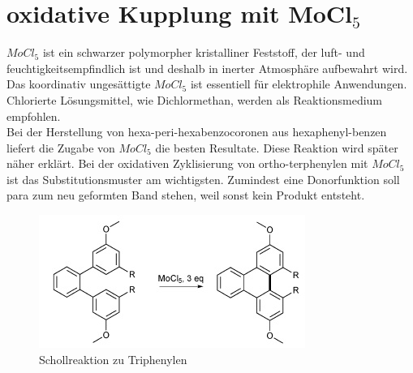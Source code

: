 \section{oxidative Kupplung mit MoCl$_5$}
$MoCl_5$ ist ein schwarzer polymorpher kristalliner Feststoff, der luft- und feuchtigkeitsempfindlich ist und deshalb in inerter Atmosphäre aufbewahrt wird. Das koordinativ ungesättigte $MoCl_5$ ist essentiell für elektrophile Anwendungen. Chlorierte Lösungsmittel, wie Dichlormethan, werden als Reaktionsmedium empfohlen.
\\Bei der Herstellung von hexa-peri-hexabenzocoronen aus hexaphenyl-benzen liefert die Zugabe von $MoCl_5$ die besten Resultate. Diese Reaktion wird später näher erklärt.
Bei der oxidativen Zyklisierung von ortho-terphenylen mit $MoCl_5$ ist das Substitutionsmuster am wichtigsten.  Zumindest eine Donorfunktion soll para zum neu geformten Band stehen, weil sonst kein Produkt entsteht. \cite{14}
\begin{figure}[htpb!]
\centering
\includegraphics[scale=0.5]{graphics/Scholltriterpene}
\caption{Schollreaktion zu Triphenylen}
\end{figure}

